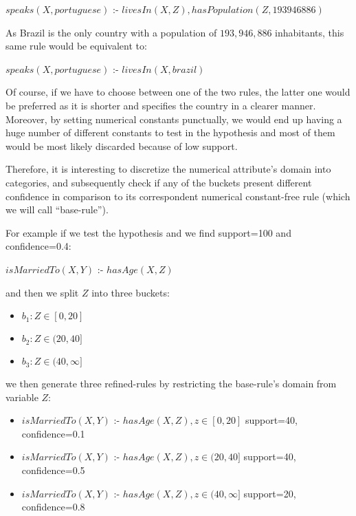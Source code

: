\begin{center}
 $speaks(X,portuguese)$ :- $livesIn(X,Z),hasPopulation(Z,193946886)$
\end{center}

As Brazil is the only country with a population of $193,946,886$ inhabitants, this same rule would be equivalent to:

\begin{center}
 $speaks(X,portuguese)$ :- $livesIn(X,brazil)$
\end{center}

Of course, if we have to choose between one of the two rules, the latter one would be preferred as it is shorter and
specifies the country in a clearer manner. Moreover, by setting numerical constants punctually, we would end up having a
huge number of different constants to test in the hypothesis and most of them would be most likely discarded because of
low support.

Therefore, it is interesting to discretize the numerical attribute's domain into categories, and
subsequently check if any of the buckets present different confidence in comparison to its correspondent numerical
constant-free rule (which we will call ``base-rule'').

For example if we test the hypothesis and we find support=100 and confidence=0.4:

\begin{center}
 $isMarriedTo(X,Y)$ :- $hasAge(X,Z)$ 
\end{center}

and then we split $Z$ into three buckets:

\begin{itemize}
 \item $ b_1: Z\in[0,20]$
 \item $ b_2: Z\in(20,40]$
 \item $ b_3: Z\in(40,\infty]$
\end{itemize}

we then generate three refined-rules by restricting the base-rule's domain from variable $Z$:

\begin{itemize}

 \item $isMarriedTo(X,Y)$ :- $hasAge(X,Z), z\in[0,20]$	
    \newline support=40, confidence=0.1
 \item $isMarriedTo(X,Y)$ :- $hasAge(X,Z), z\in(20,40]$	
    \newline support=40, confidence=0.5
 \item $isMarriedTo(X,Y)$ :- $hasAge(X,Z), z\in(40,\infty]$
    \newline support=20, confidence=0.8

\end{itemize}

